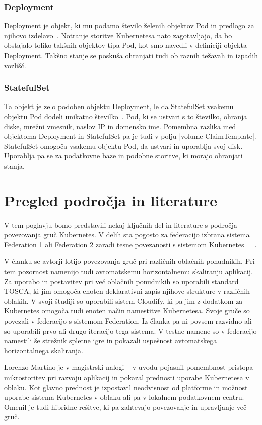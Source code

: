 \documentclass[a4paper, 12pt]{book}
\begin{document}
\subsection{Deployment}
Deployment je objekt, ki mu podamo število želenih objektov Pod in predlogo za njihovo izdelavo~\cite{deployment}.
Notranje storitve Kubernetesa nato zagotavljajo, da bo obstajalo toliko takšnih objektov tipa Pod, kot smo navedli v definiciji objekta Deployment.
Takšno stanje se poskuša ohranjati tudi ob raznih težavah in izpadih vozlišč.
\subsection{StatefulSet}
Ta objekt je zelo podoben objektu Deployment, le da StatefulSet vsakemu objektu Pod dodeli unikatno številko~\cite{statefulset}. 
Pod, ki se ustvari s to številko, ohranja diske, mrežni vmesnik, naslov IP in domensko ime.
Pomembna razlika med objektoma Deployment in StatefulSet pa je tudi v polju \spverb|volume ClaimTemplate|.
StatefulSet omogoča vsakemu objektu Pod, da ustvari in uporablja svoj disk.
Uporablja pa se za podatkovne baze in podobne storitve, ki morajo ohranjati stanja.
\chapter{Pregled področja in literature}
V tem poglavju bomo predstavili nekaj ključnih del in literature s področja povezovanja gruč Kubernetes.
V delih sta pogosto za federacijo izbrana sistema Federation 1 ali Federation 2 zaradi tesne povezanosti s sistemom Kubernetes~\cite{tosca-fed}~\cite{dyn-place}~\cite{kube-and-edge}.

V članku \cite{tosca-fed} se avtorji lotijo povezovanja gruč pri različnih oblačnih ponudnikih.
Pri tem pozornost namenijo tudi avtomatskemu horizontalnemu skaliranju aplikacij.
Za uporabo in postavitev pri več oblačnih ponudnikih so uporabili standard TOSCA, ki jim omogoča enoten deklarativni zapis njihove strukture v različnih oblakih.
V svoji študiji so uporabili sistem Cloudify, ki pa jim z dodatkom za Kubernetes omogoča tudi enoten način namestitve Kubernetesa.
Svoje gruče so povezali v federacijo s sistemom Federation. 
Iz članka pa ni povsem razvidno ali so uporabili prvo ali drugo iteracijo tega sistema.
V testne namene so v federacijo namestili še strežnik spletne igre in pokazali uspešnost avtomatskega horizontalnega skaliranja.

Lorenzo Martino je v magistrski nalogi ~\cite{dyn-place} v uvodu pojasnil pomembnost pristopa mikrostoritev pri razvoju aplikacij in pokazal prednosti uporabe Kubernetesa v oblaku.
Kot glavno prednost je izpostavil neodvisnost od platforme in možnost uporabe sistema Kubernetes v oblaku ali pa v lokalnem podatkovnem centru.
Omenil je tudi hibridne rešitve, ki pa zahtevajo povezovanje in upravljanje več gruč.
\end{document}
